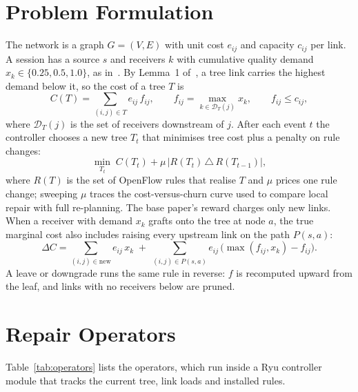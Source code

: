 \section{Problem Formulation}\label{sec:m_formulation}
\noindent The network is a graph $G=(V,E)$ with unit cost $e_{ij}$ and capacity $c_{ij}$ per link. A session has a source $s$ and receivers $k$ with cumulative quality demand $x_k \in \{0.25, 0.5, 1.0\}$, as in~\cite{wang2026gnn}. By Lemma~1 of~\cite{wang2026gnn}, a tree link carries the highest demand below it, so the cost of a tree $T$ is
\begin{equation}
C(T) = \sum_{(i,j) \in T} e_{ij}\, f_{ij}, \qquad f_{ij} = \max_{k \in \mathcal{D}_T(j)} x_k, \qquad f_{ij} \le c_{ij},
\label{eq:tree_cost}
\end{equation}
where $\mathcal{D}_T(j)$ is the set of receivers downstream of $j$. After each event $t$ the controller chooses a new tree $T_t$ that minimises tree cost plus a penalty on rule changes:
\begin{equation}
\min_{T_t}\; C(T_t) + \mu \,\bigl| R(T_t) \,\triangle\, R(T_{t-1}) \bigr| ,
\label{eq:objective}
\end{equation}
where $R(T)$ is the set of OpenFlow rules that realise $T$ and $\mu$ prices one rule change; sweeping $\mu$ traces the cost-versus-churn curve used to compare local repair with full re-planning. The base paper's reward charges only new links. When a receiver with demand $x_k$ grafts onto the tree at node $a$, the true marginal cost also includes raising every upstream link on the path $P(s,a)$:
\begin{equation}
\Delta C = \sum_{(i,j) \in \text{new}} e_{ij}\, x_k \;+\; \sum_{(i,j) \in P(s,a)} e_{ij}\,\bigl(\max(f_{ij}, x_k) - f_{ij}\bigr).
\label{eq:delta_cost}
\end{equation}
A leave or downgrade runs the same rule in reverse: $f$ is recomputed upward from the leaf, and links with no receivers below are pruned.

\section{Repair Operators}\label{sec:m_operators}
\noindent Table~\ref{tab:operators} lists the operators, which run inside a Ryu controller module that tracks the current tree, link loads and installed rules.

